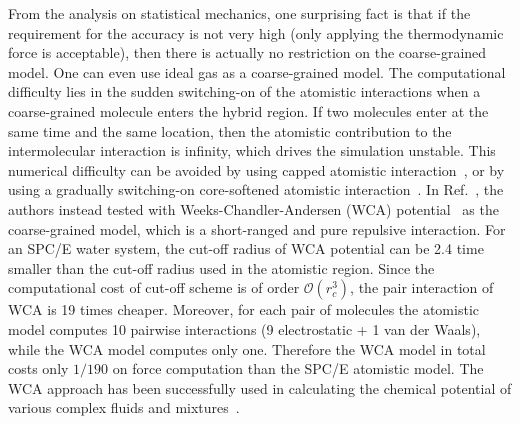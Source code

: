 \documentclass[epjST]{svjour}
\newcommand{\vect}[1]{\textbf{\textit{#1}}}
\newcommand{\mo}[0]{\mathcal {O}}
\newcommand{\AT}[0]{\textrm{AT}}
\newcommand{\HY}[0]{\textrm{HY}}
\begin{document}
From the analysis on statistical mechanics, one surprising fact is that if the
requirement for the accuracy is not very high (only applying the
thermodynamic force is acceptable), then there is actually no
restriction on the coarse-grained model. One can even use ideal gas as
a coarse-grained model.  The computational difficulty lies in the
sudden switching-on of the atomistic interactions when a coarse-grained
molecule enters the hybrid region. If two molecules enter at
the same time and the same location, then the atomistic contribution
to the intermolecular interaction
is infinity, which drives the simulation
unstable. This numerical difficulty can be avoided by using capped
atomistic interaction~\cite{praprotnik2005adaptive}, or by using a
gradually switching-on core-softened atomistic
interaction~\cite{heyes2010thermodynamic}.
In Ref.~\cite{wang2013grand}, the authors instead tested with
Weeks-Chandler-Andersen (WCA) potential~\cite{weeks1971role} as the
coarse-grained model, which is a short-ranged and pure repulsive
interaction.  For an SPC/E water system, the cut-off radius of WCA potential
can be 2.4 time smaller than the cut-off radius used in the atomistic
region. Since the computational cost of cut-off scheme is of order $\mo(r_c^3)$,
the pair interaction of WCA
is 19 times cheaper. Moreover, for each pair of molecules the atomistic model computes
10 pairwise interactions (9 electrostatic + 1 van der Waals), while the
WCA model computes only one. Therefore the WCA model in total costs only $1/190$ 
on force computation than the SPC/E atomistic model.
The WCA approach has been successfully used in calculating the
chemical potential of various complex fluids and mixtures~\cite{agarwal2014chemical}.


\end{document}
